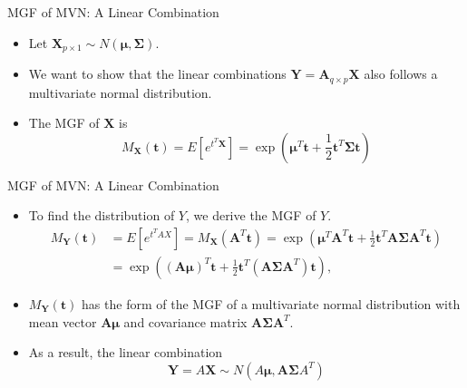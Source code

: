 \documentclass[
  ignorenonframetext,
]{beamer}
\begin{document}
\begin{frame}{MGF of MVN: A Linear Combination}
\protect\hypertarget{mgf-of-mvn-a-linear-combination}{}
\begin{itemize}
\item
  Let
  \(\mathbf{X}_{p\times 1}\sim N(\boldsymbol \mu, \boldsymbol \Sigma)\).
\item
  We want to show that the linear combinations
  \(\mathbf{Y} = \mathbf{A}_{q\times p}\mathbf{X}\) also follows a
  multivariate normal distribution.
\item
  The MGF of \(\mathbf X\) is \[
  M_{\mathbf{X}}(\mathbf{t}) = E[e^{t^T\mathbf X}]=\exp\left(\boldsymbol{\mu}^T \mathbf{t} + \frac{1}{2} \mathbf{t}^T \boldsymbol{\Sigma} \mathbf{t}\right)
  \]
\end{itemize}
\end{frame}

\begin{frame}{MGF of MVN: A Linear Combination}
\protect\hypertarget{mgf-of-mvn-a-linear-combination-1}{}
\begin{itemize}
\item
  To find the distribution of \(Y\), we derive the MGF of \(Y\). \[
  \begin{aligned}
  M_{\mathbf{Y}}(\mathbf{t}) &= E[e^{t^TAX}]=M_{\mathbf{X}}(\mathbf{A}^T \mathbf{t}) = \exp\left(\boldsymbol{\mu}^T \mathbf{A}^T \mathbf{t} + \frac{1}{2} \mathbf{t}^T \mathbf{A} \boldsymbol{\Sigma} \mathbf{A}^T \mathbf{t}\right)\\
  &=\exp\left((\mathbf{A}\boldsymbol{\mu})^T \mathbf{t} + \frac{1}{2} \mathbf{t}^T (\mathbf{A}\boldsymbol{\Sigma}\mathbf{A}^T) \mathbf{t}\right),
  \end{aligned}
  \]
\item
  \(M_{\mathbf{Y}}(\mathbf{t})\) has the form of the MGF of a
  multivariate normal distribution with mean vector
  \(\mathbf{A}\boldsymbol{\mu}\) and covariance matrix
  \(\mathbf{A}\boldsymbol{\Sigma}\mathbf{A}^T\).
\item
  As a result, the linear combination
  \[\mathbf Y =A \mathbf X \sim N(A \boldsymbol \mu, \boldsymbol A \boldsymbol \Sigma A^T)\]
\end{itemize}
\end{frame}
\end{document}
